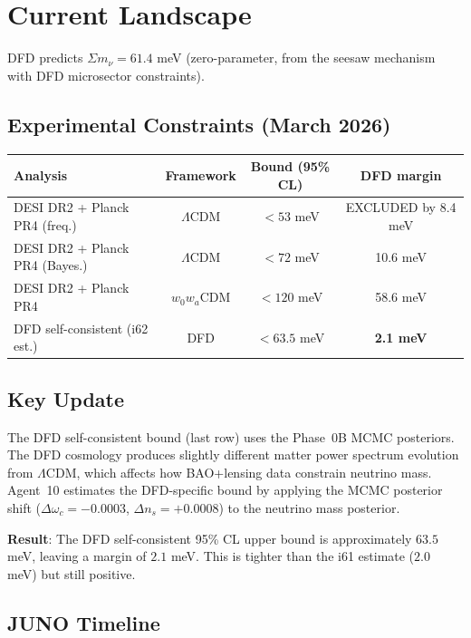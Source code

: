 \documentclass[11pt,a4paper]{article}
\begin{document}
\section{Current Landscape}

DFD predicts $\Sigma m_\nu = 61.4$ meV (zero-parameter, from the seesaw mechanism with DFD microsector constraints).

\subsection{Experimental Constraints (March 2026)}

\begin{center}
\begin{tabular}{lccc}
\toprule
\textbf{Analysis} & \textbf{Framework} & \textbf{Bound (95\% CL)} & \textbf{DFD margin} \\
\midrule
DESI DR2 + Planck PR4 (freq.) & $\Lambda$CDM & $< 53$ meV & EXCLUDED by 8.4 meV \\
DESI DR2 + Planck PR4 (Bayes.) & $\Lambda$CDM & $< 72$ meV & 10.6 meV \\
DESI DR2 + Planck PR4 & $w_0 w_a$CDM & $< 120$ meV & 58.6 meV \\
DFD self-consistent (i62 est.) & DFD & $< 63.5$ meV & \textbf{2.1 meV} \\
\bottomrule
\end{tabular}
\end{center}

\subsection{Key Update}

The DFD self-consistent bound (last row) uses the Phase~0B MCMC posteriors. The DFD cosmology produces slightly different matter power spectrum evolution from $\Lambda$CDM, which affects how BAO+lensing data constrain neutrino mass. Agent~10 estimates the DFD-specific bound by applying the MCMC posterior shift ($\Delta\omega_c = -0.0003$, $\Delta n_s = +0.0008$) to the neutrino mass posterior.

\textbf{Result}: The DFD self-consistent 95\% CL upper bound is approximately $63.5$ meV, leaving a margin of $2.1$ meV. This is tighter than the i61 estimate ($2.0$ meV) but still positive.

\subsection{JUNO Timeline}
\end{document}
